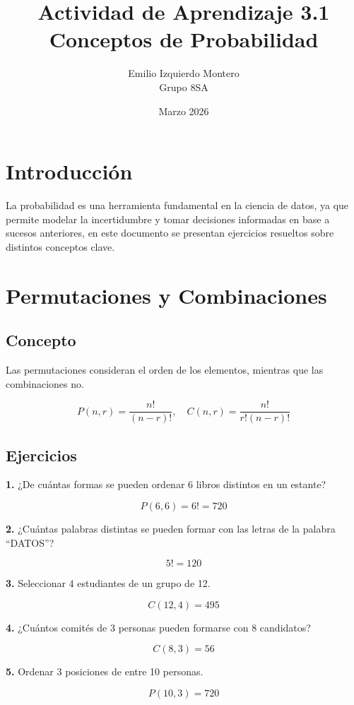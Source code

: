 \documentclass[12pt]{article}
\title{\textbf{Actividad de Aprendizaje 3.1 \\ Conceptos de Probabilidad}}
\author{Emilio Izquierdo Montero \\ Grupo 8SA}
\date{Marzo 2026}
\begin{document}
\maketitle

\section*{Introducción}
La probabilidad es una herramienta fundamental en la ciencia de datos, ya que permite modelar la incertidumbre y tomar decisiones informadas en base a sucesos anteriores, en este documento se presentan ejercicios resueltos sobre distintos conceptos clave.

\newpage

\section{Permutaciones y Combinaciones}

\subsection*{Concepto}
Las permutaciones consideran el orden de los elementos, mientras que las combinaciones no.

\begin{equation}
P(n,r)=\frac{n!}{(n-r)!}, \quad C(n,r)=\frac{n!}{r!(n-r)!}
\end{equation}

\subsection*{Ejercicios}

\textbf{1.} ¿De cuántas formas se pueden ordenar 6 libros distintos en un estante?

\[
P(6,6)=6!=720
\]

\textbf{2.} ¿Cuántas palabras distintas se pueden formar con las letras de la palabra ``DATOS''?

\[
5!=120
\]

\textbf{3.} Seleccionar 4 estudiantes de un grupo de 12.

\[
C(12,4)=495
\]

\textbf{4.} ¿Cuántos comités de 3 personas pueden formarse con 8 candidatos?

\[
C(8,3)=56
\]

\textbf{5.} Ordenar 3 posiciones de entre 10 personas.

\[
P(10,3)=720
\]
\end{document}
